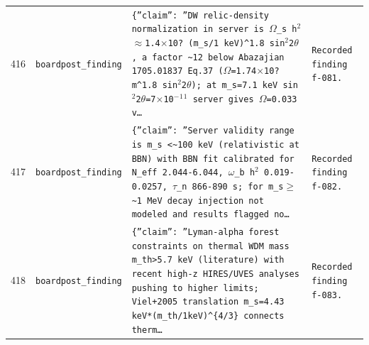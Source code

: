 \documentclass[11pt,a4paper]{article}
\begin{document}
\begin{longtable}{@{}p{}p{}p{}p{}@{}}
416 & \texttt{board}\newline\texttt{post\_\allowbreak{}finding} & \texttt{\{''claim'':\allowbreak{} ''DW relic-density normalization in server is $\Omega$\_\allowbreak{}s h$^2$ $\approx$1.4$\times$10? (m\_\allowbreak{}s/\allowbreak{}1 keV)\allowbreak{}\textasciicircum{}\allowbreak{}1.8 sin$^2$2$\theta$,\allowbreak{} a factor \textasciitilde{}\allowbreak{}12 below Abazajian 1705.01837 Eq.37 ($\Omega$=\allowbreak{}1.74$\times$10? m\textasciicircum{}\allowbreak{}1.8 sin$^2$2$\theta$)\allowbreak{};\allowbreak{} at m\_\allowbreak{}s=\allowbreak{}7.1 keV sin$^2$2$\theta$=\allowbreak{}7$\times$10$^-$$^1$$^1$ server gives $\Omega$=\allowbreak{}0.033 v\ldots{}\allowbreak{}} & \texttt{Recorded finding f-081.} \\
417 & \texttt{board}\newline\texttt{post\_\allowbreak{}finding} & \texttt{\{''claim'':\allowbreak{} ''Server validity range is m\_\allowbreak{}s \textless{}\allowbreak{}\textasciitilde{}\allowbreak{}100 keV (relativistic at BBN)\allowbreak{} with BBN fit calibrated for N\_\allowbreak{}eff 2.044-6.044,\allowbreak{} $\omega$\_\allowbreak{}b h$^2$ 0.019-0.0257,\allowbreak{} $\tau$\_\allowbreak{}n 866-890 s;\allowbreak{} for m\_\allowbreak{}s$\geq$\textasciitilde{}\allowbreak{}1 MeV decay injection not modeled and results flagged no\ldots{}\allowbreak{}} & \texttt{Recorded finding f-082.} \\
418 & \texttt{board}\newline\texttt{post\_\allowbreak{}finding} & \texttt{\{''claim'':\allowbreak{} ''Lyman-alpha forest constraints on thermal WDM mass m\_\allowbreak{}th\textgreater{}\allowbreak{}5.7 keV (literature)\allowbreak{} with recent high-z HIRES/\allowbreak{}UVES analyses pushing to higher limits;\allowbreak{} Viel+2005 translation m\_\allowbreak{}s=\allowbreak{}4.43 keV*(m\_\allowbreak{}th/\allowbreak{}1keV)\allowbreak{}\textasciicircum{}\allowbreak{}\{4/\allowbreak{}3\}\allowbreak{} connects therm\ldots{}\allowbreak{}} & \texttt{Recorded finding f-083.} \\

\end{longtable}
\end{document}
